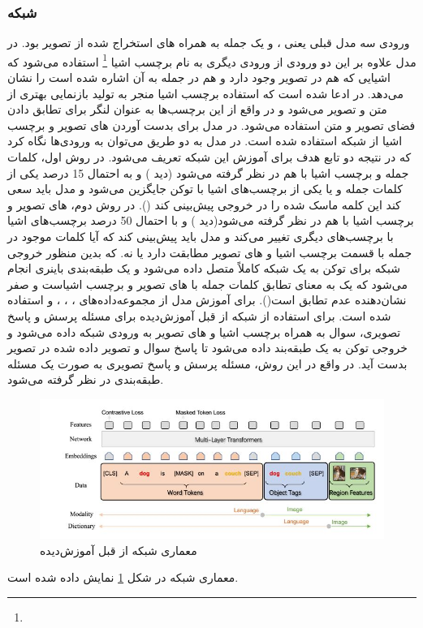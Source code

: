 \subsubsection{   شبکه }
	ورودی سه مدل قبلی یعنی 
	،
	و 
	یک جمله به همراه 
	های استخراج شده از تصویر بود. در مدل 
	علاوه بر این دو ورودی از ورودی دیگری به نام برچسب اشیا
	\footnote{}
	استفاده می‌شود که اشیایی که هم در تصویر وجود دارد و هم در جمله به آن اشاره شده است را نشان می‌دهد. در 
	\cite{li2020oscar}
ادعا شده است که استفاده برچسب اشیا منجر به تولید بازنمایی بهتری از متن و تصویر می‌شود و در واقع از این برچسب‌ها به عنوان لنگر برای تطابق دادن فضای تصویر و متن استفاده می‌شود. در مدل
	برای بدست آوردن 
	های تصویر و برچسب اشیا از شبکه 
	استفاده شده است. در مدل 
	به دو طریق می‌توان به ورود‌ی‌ها نگاه کرد که در نتیجه دو تابع هدف برای آموزش این شبکه تعریف می‌شود. در روش اول، کلمات جمله و برچسب اشیا با هم در نظر گرفته می‌شود (دید ) و به احتمال 15 درصد یکی از کلمات جمله و یا یکی از برچسب‌های اشیا با توکن 
	\lr{[MASK]}
	جایگزین می‌شود و مدل باید سعی کند این کلمه ماسک شده را در خروجی پیش‌بینی کند
	().
	در روش دوم،
	های تصویر و برچسب اشیا با هم در نظر گرفته می‌شود(دید ) و با احتمال 50 درصد برچسب‌های اشیا با برچسب‌های دیگری تغییر می‌کند و مدل باید پیش‌بینی کند که آیا کلمات موجود در جمله با قسمت برچسب اشیا و 
	های تصویر مطابقت دارد یا نه. که بدین منظور خروجی شبکه برای توکن
	\lr{[CLS]}
	به یک شبکه کاملاً متصل داده می‌شود و یک طبقه‌بندی باینری انجام می‌شود که یک به معنای تطابق کلمات جمله با 
	های تصویر و برچسب اشیاست و صفر نشان‌دهنده عدم تطابق است().  برای آموزش مدل 
	از مجموعه‌داده‌های
	،
	،
	،
	و
	استفاده شده است. برای استفاده از شبکه از قبل آموزش‌دیده
	برای مسئله پرسش و پاسخ تصویری، سوال به همراه برچسب اشیا و 
	های تصویر به ورودی شبکه داده ‌می‌شود و خروجی توکن
	\lr{[CLS]}
	به یک طبقه‌بند داده ‌می‌شود تا پاسخ سوال و تصویر داده شده در تصویر بدست آید. در واقع در این روش، مسئله پرسش و پاسخ تصویری به صورت یک مسئله طبقه‌بندی در نظر گرفته ‌می‌شود.
	\begin{figure}
		\centerline{\includegraphics[scale=0.7]{images/OSCAR.JPG}}
		\caption[معماری شبکه از قبل آموزش‌دیده]{معماری شبکه از قبل آموزش‌دیده\cite{li2020oscar}}
		\label{fig:OSCAR}
	\end{figure}
	معماری شبکه 
	در شکل 
	\ref{fig:OSCAR}
	نمایش داده شده است.
	
